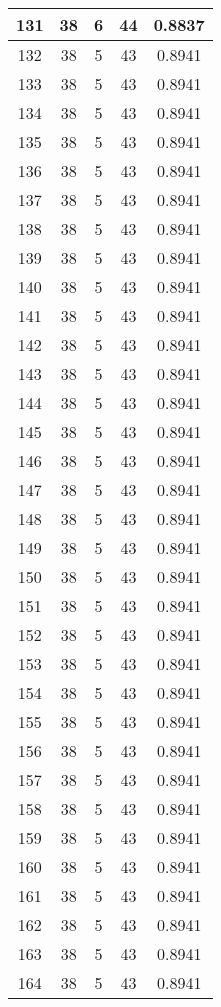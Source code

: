 \documentclass[letterpaper, 12pt]{article}
\begin{document}
\begin{longtable}{|c|c|c|c|c|}
\hline
131 & 38 & 6 & 44 & 0.8837 \\
\hline
132 & 38 & 5 & 43 & 0.8941 \\
\hline
133 & 38 & 5 & 43 & 0.8941 \\
\hline
134 & 38 & 5 & 43 & 0.8941 \\
\hline
135 & 38 & 5 & 43 & 0.8941 \\
\hline
136 & 38 & 5 & 43 & 0.8941 \\
\hline
137 & 38 & 5 & 43 & 0.8941 \\
\hline
138 & 38 & 5 & 43 & 0.8941 \\
\hline
139 & 38 & 5 & 43 & 0.8941 \\
\hline
140 & 38 & 5 & 43 & 0.8941 \\
\hline
141 & 38 & 5 & 43 & 0.8941 \\
\hline
142 & 38 & 5 & 43 & 0.8941 \\
\hline
143 & 38 & 5 & 43 & 0.8941 \\
\hline
144 & 38 & 5 & 43 & 0.8941 \\
\hline
145 & 38 & 5 & 43 & 0.8941 \\
\hline
146 & 38 & 5 & 43 & 0.8941 \\
\hline
147 & 38 & 5 & 43 & 0.8941 \\
\hline
148 & 38 & 5 & 43 & 0.8941 \\
\hline
149 & 38 & 5 & 43 & 0.8941 \\
\hline
150 & 38 & 5 & 43 & 0.8941 \\
\hline
151 & 38 & 5 & 43 & 0.8941 \\
\hline
152 & 38 & 5 & 43 & 0.8941 \\
\hline
153 & 38 & 5 & 43 & 0.8941 \\
\hline
154 & 38 & 5 & 43 & 0.8941 \\
\hline
155 & 38 & 5 & 43 & 0.8941 \\
\hline
156 & 38 & 5 & 43 & 0.8941 \\
\hline
157 & 38 & 5 & 43 & 0.8941 \\
\hline
158 & 38 & 5 & 43 & 0.8941 \\
\hline
159 & 38 & 5 & 43 & 0.8941 \\
\hline
160 & 38 & 5 & 43 & 0.8941 \\
\hline
161 & 38 & 5 & 43 & 0.8941 \\
\hline
162 & 38 & 5 & 43 & 0.8941 \\
\hline
163 & 38 & 5 & 43 & 0.8941 \\
\hline
164 & 38 & 5 & 43 & 0.8941 \\

\end{longtable}
\end{document}
